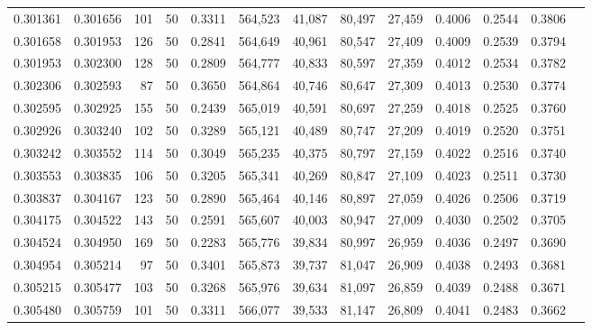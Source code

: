 \begin{tabular}{rrrrrrrrrrrrr}
0.301361 & 0.301656 &   101 &  50 &                                     0.3311 & 564,523 &  41,087 &  80,497 &  27,459 & 0.4006 & 0.2544 & 0.3806 \\
0.301658 & 0.301953 &   126 &  50 &                                     0.2841 & 564,649 &  40,961 &  80,547 &  27,409 & 0.4009 & 0.2539 & 0.3794 \\
0.301953 & 0.302300 &   128 &  50 &                                     0.2809 & 564,777 &  40,833 &  80,597 &  27,359 & 0.4012 & 0.2534 & 0.3782 \\
0.302306 & 0.302593 &    87 &  50 &                                     0.3650 & 564,864 &  40,746 &  80,647 &  27,309 & 0.4013 & 0.2530 & 0.3774 \\
0.302595 & 0.302925 &   155 &  50 &                                     0.2439 & 565,019 &  40,591 &  80,697 &  27,259 & 0.4018 & 0.2525 & 0.3760 \\
0.302926 & 0.303240 &   102 &  50 &                                     0.3289 & 565,121 &  40,489 &  80,747 &  27,209 & 0.4019 & 0.2520 & 0.3751 \\
0.303242 & 0.303552 &   114 &  50 &                                     0.3049 & 565,235 &  40,375 &  80,797 &  27,159 & 0.4022 & 0.2516 & 0.3740 \\
0.303553 & 0.303835 &   106 &  50 &                                     0.3205 & 565,341 &  40,269 &  80,847 &  27,109 & 0.4023 & 0.2511 & 0.3730 \\
0.303837 & 0.304167 &   123 &  50 &                                     0.2890 & 565,464 &  40,146 &  80,897 &  27,059 & 0.4026 & 0.2506 & 0.3719 \\
0.304175 & 0.304522 &   143 &  50 &                                     0.2591 & 565,607 &  40,003 &  80,947 &  27,009 & 0.4030 & 0.2502 & 0.3705 \\
0.304524 & 0.304950 &   169 &  50 &                                     0.2283 & 565,776 &  39,834 &  80,997 &  26,959 & 0.4036 & 0.2497 & 0.3690 \\
0.304954 & 0.305214 &    97 &  50 &                                     0.3401 & 565,873 &  39,737 &  81,047 &  26,909 & 0.4038 & 0.2493 & 0.3681 \\
0.305215 & 0.305477 &   103 &  50 &                                     0.3268 & 565,976 &  39,634 &  81,097 &  26,859 & 0.4039 & 0.2488 & 0.3671 \\
0.305480 & 0.305759 &   101 &  50 &                                     0.3311 & 566,077 &  39,533 &  81,147 &  26,809 & 0.4041 & 0.2483 & 0.3662 \\

\end{tabular}
